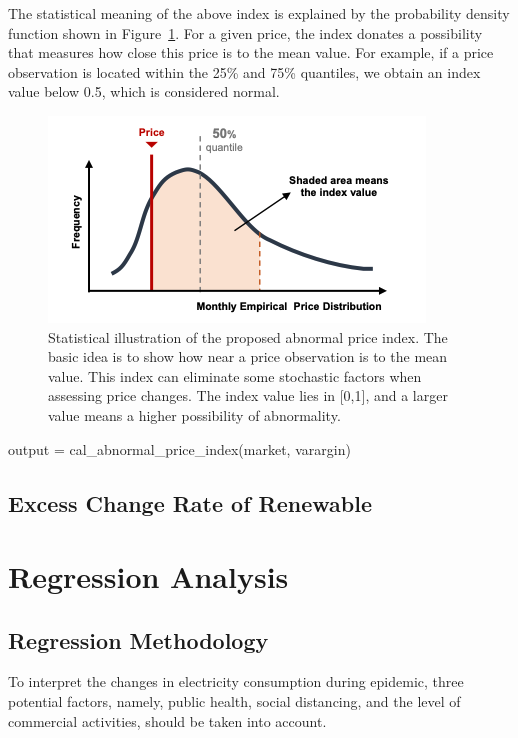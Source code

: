 \documentclass[11pt]{article}
\numberwithin{equation}{section}
\numberwithin{table}{section}
\numberwithin{figure}{section}
\begin{document}
The statistical meaning of the above index is explained by the probability density function shown in Figure~\ref{fig:abnormal_price_index}. For a given price, the index donates a possibility that measures how close this price is to the mean value. For example, if a price observation is located within the 25\% and 75\% quantiles, we obtain an index value below 0.5, which is considered normal.
\begin{figure}
  \centering
  \includegraphics[width=.8\textwidth]{figures/abnormal_price_index.png}
  \caption{Statistical illustration of the proposed abnormal price index. The basic idea is to show how near a price observation is to the mean value. This index can eliminate some stochastic factors when assessing price changes. The index value lies in [0,1], and a larger value means a higher possibility of abnormality.}
  \label{fig:abnormal_price_index}
\end{figure}

\begin{Code}
output = cal_abnormal_price_index(market, varargin)
\end{Code}
\subsection{Excess Change Rate of Renewable}





\newpage
\section{Regression Analysis} \label{sec:regression}

\subsection{Regression Methodology}
To interpret the changes in electricity consumption during epidemic, three potential factors, namely, public health, social distancing, and the level of commercial activities, should be taken into account. 
\end{document}
